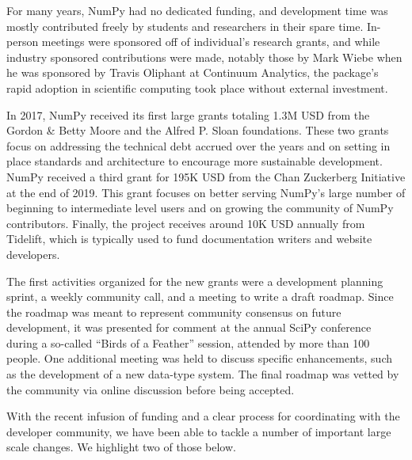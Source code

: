 For many years, NumPy had no dedicated funding, and development time
was mostly contributed freely by students and researchers in their
spare time.  In-person meetings were sponsored off of individual's
research grants, and while industry sponsored contributions were made,
notably those by Mark Wiebe when he was sponsored by Travis Oliphant
at Continuum Analytics, the package's rapid adoption in scientific
computing took place without external investment.

In 2017, NumPy received its first large grants totaling 1.3M USD from the
Gordon \& Betty Moore and the Alfred P. Sloan foundations.
These two grants focus on addressing the technical debt accrued over the years and
on setting in place standards and architecture to encourage more sustainable development.
NumPy received a third grant for 195K USD from the Chan Zuckerberg
Initiative at the end of 2019.
This grant focuses on better serving NumPy's large number of beginning
to intermediate level users and on growing the community of NumPy
contributors.
Finally, the project receives around 10K USD annually from Tidelift, which is
typically used to fund documentation writers and website developers.

The first activities organized for the new grants were a development planning
sprint, a weekly community call, and a meeting to write a draft roadmap.
Since the roadmap was meant to represent community consensus on future
development, it was presented for comment at the annual SciPy
conference during a so-called ``Birds of a Feather'' session, attended
by more than 100 people.  One additional meeting was held to discuss
specific enhancements, such as the development of a new data-type
system.  The final roadmap was vetted by the community via online
discussion before being accepted.

With the recent infusion of funding and a clear process for coordinating with
the developer community, we have been able to tackle a number of important
large scale changes.
We highlight two of those below.

